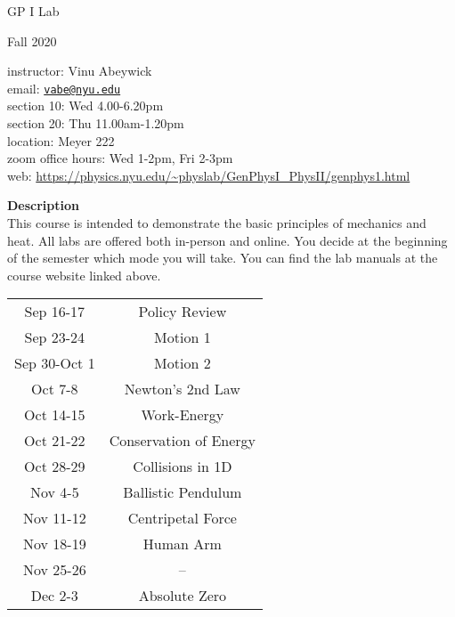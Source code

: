\documentclass[11pt]{extarticle}
\begin{document}
\setlength{\parindent}{0pt}

\begin{center}
	\huge 
	GP I Lab

	\vspace{0.5cm}
	\large 
	Fall 2020
\end{center}

\hfill

\begin{adjustwidth}{0.5cm}{}
	instructor: Vinu Abeywick \\ 
	email: \href{mailto:vabe@nyu.edu}{\texttt{vabe@nyu.edu}} \\ 
	section 10: Wed 4.00-6.20pm \\ 
	section 20: Thu 11.00am-1.20pm \\ 
	location: Meyer 222 \\ 
	zoom office hours: Wed 1-2pm, Fri 2-3pm \\  
	web: \url{https://physics.nyu.edu/~physlab/GenPhysI_PhysII/genphys1.html}
\end{adjustwidth}

\hfill 

{\bf \Large Description} \\ 

This course is intended to demonstrate the basic principles of mechanics and heat. All labs are offered both in-person and online. You decide at the beginning of the semester which mode you will take. You can find the lab manuals at the course website linked above. \\ 

\begin{table}[h]
	\centering
		\begin{tabular}{ c 	c }
			Sep 16-17 & Policy Review \\ 
			Sep 23-24 & Motion 1 \\ 
			Sep 30-Oct 1 & Motion 2 \\ 
			Oct 7-8 & Newton's 2nd Law \\ 
			Oct 14-15 & Work-Energy \\ 
			Oct 21-22 & Conservation of Energy \\ 
			Oct 28-29 & Collisions in 1D \\ 
			Nov 4-5 & Ballistic Pendulum \\ 
			Nov 11-12 & Centripetal Force \\ 
			Nov 18-19 & Human Arm \\ 
			Nov 25-26 & -- \\ 
			Dec 2-3 & Absolute Zero \\ 
		\end{tabular}
\end{table}
\end{document}
